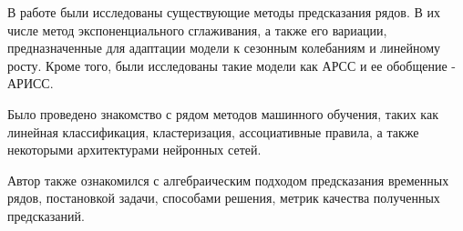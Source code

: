 В работе были исследованы существующие методы предсказания рядов. В их числе метод экспоненциального сглаживания, а также его вариации, предназначенные для адаптации модели к сезонным колебаниям и линейному росту. Кроме того, были исследованы такие модели как АРСС и ее обобщение - АРИСС. 

Было проведено знакомство с рядом методов машинного обучения, таких как линейная классификация, кластеризация, ассоциативные правила, а также некоторыми архитектурами нейронных сетей.

Автор также ознакомился с алгебраическим подходом предсказания временных рядов, постановкой задачи, способами решения, метрик качества полученных предсказаний. 